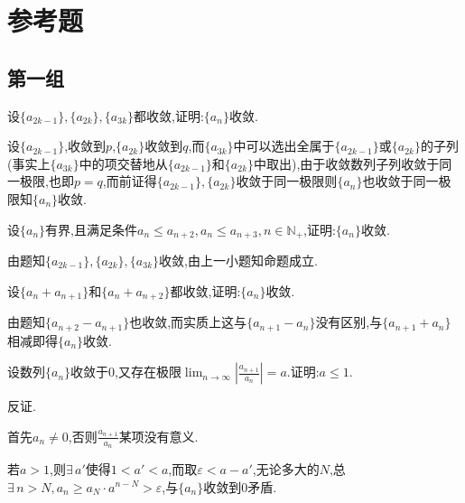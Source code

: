 
\section{参考题}
 \subsection{第一组}
     \begin{exercise}
         设$\{a_{2k-1}\},\{a_{2k}\},\{a_{3k}\}$都收敛,证明:$\{a_n\}$收敛.
     \end{exercise}
     \begin{solution}
         设$\{a_{2k-1}\}$,收敛到$p$,$\{a_{2k}\}$收敛到$q$,而$\{a_{3k}\}$中可以选出全属于$\{a_{2k-1}\}$或$\{a_{2k}\}$的子列(事实上$\{a_{3k}\}$中的项交替地从$\{a_{2k-1}\}$和$\{a_{2k}\}$中取出),由于收敛数列子列收敛于同一极限,也即$p=q$,而前证得$\{a_{2k-1}\},\{a_{2k}\}$收敛于同一极限则$\{a_n\}$也收敛于同一极限知$\{a_n\}$收敛.
     \end{solution}

     \begin{exercise}
         设$\{a_n\}$有界,且满足条件$a_n\leqslant a_{n+2},a_n\leqslant a_{n+3},n\in \mathbb{N}_+$,证明:$\{a_n\}$收敛.
     \end{exercise}
     \begin{solution}
         由题知$\{a_{2k-1}\},\{a_{2k}\},\{a_{3k}\}$收敛,由上一小题知命题成立.
     \end{solution}

     \begin{exercise}
         设$\{a_n+a_{n+1}\}$和$\{a_n+a_{n+2}\}$都收敛,证明:$\{a_n\}$收敛.
     \end{exercise}
     \begin{solution}
         由题知$\{a_{n+2}-a_{n+1}\}$也收敛,而实质上这与$\{a_{n+1}-a_n\}$没有区别,与$\{a_{n+1}+a_n\}$相减即得$\{a_n\}$收敛.
     \end{solution}

     \begin{exercise}
         设数列$\{a_n\}$收敛于0,又存在极限$\lim _{n\to\infty} \left| \frac {a_{n+1}}{a_n} \right|=a$.证明:$a\leqslant 1$.
     \end{exercise}
     \begin{solution}
         反证.

         首先$a_n\neq0$,否则$\frac{a_{n+1}}{a_n}$某项没有意义.

         若$a>1$,则$\exists\, a'$使得$1<a'<a$,而取$\varepsilon<a-a'$,无论多大的$N$,总$\exists\, n>N,a_n\geqslant a_N\cdot a^{n-N}>\varepsilon$,与$\{a_n\}$收敛到0矛盾.
     \end{solution}

